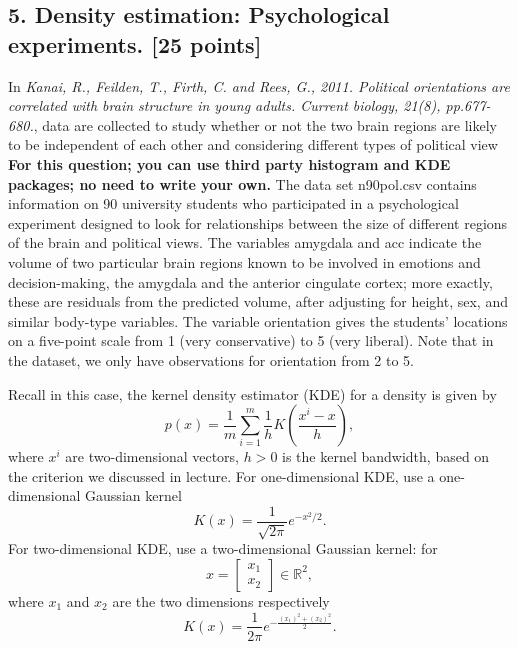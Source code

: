 \documentclass[twoside,10pt]{article}
\begin{document}
\clearpage



\subsection*{5. Density estimation: Psychological experiments. [25 points]}


In {\it Kanai, R., Feilden, T., Firth, C. and Rees, G., 2011. Political orientations are correlated with brain structure in young adults. Current biology, 21(8), pp.677-680.}, data are collected to  study whether or not the two brain regions are likely to be independent of each other and considering different types of political view \textbf{For this question; you can use third party histogram and KDE packages; no need to write your own.} The data set \textsf{n90pol.csv} contains information on 90 university students who participated in a psychological experiment designed to look for relationships between the size of different regions of the brain and political views. The variables \textsf{amygdala} and \textsf{acc} indicate the volume of two particular brain regions known to be involved in emotions and decision-making, the amygdala and the anterior cingulate cortex; more exactly, these are residuals from the predicted volume, after adjusting for height, sex, and similar body-type variables. The variable \textsf{orientation} gives the students' locations on a five-point scale from 1 (very conservative) to 5 (very liberal).  Note that in the dataset, we only have observations for orientation from 2 to 5. 

Recall in this case, the kernel density estimator (KDE) for a density is given by
 \[
 p(x) = \frac 1 m \sum_{i=1}^m \frac 1 h
 K\left(
 \frac{x^i - x}{h}
 \right),
 \]
where $x^i$ are two-dimensional vectors, $h >0$ is the kernel bandwidth, based on the criterion we discussed in lecture. 
For one-dimensional KDE,  use a one-dimensional Gaussian kernel
\[
K(x) = \frac{1}{\sqrt{2\pi}} e^{-x^2/2}.
\]
For two-dimensional KDE, use a two-dimensional Gaussian kernel: for \[x = \begin{bmatrix}x_1\\x_2\end{bmatrix}\in \mathbb R^2,\] where $x_1$ and $x_2$ are the two dimensions respectively \[K(x) = \frac{1}{2\pi} e^{-\frac{(x_1)^2 + (x_2)^2}{2}}.\] 
  
\end{document}
